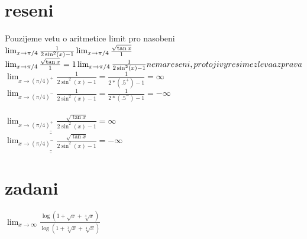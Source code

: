 \documentclass[a4paper]{article}
\def\doubleunderline#1{\underline{\underline{#1}}}
\begin{document}
\section*{reseni}
Pouzijeme vetu o aritmetice limit pro nasobeni\\
$
\lim_{x \rightarrow \pi / 4} \frac{1}{2 \sin^2 (x) -1}\\
\lim_{x \rightarrow \pi / 4} \frac{\sqrt{\tan x}}{1}
$\\
$
\lim_{x \rightarrow \pi / 4} \frac{\sqrt{\tan x}}{1} = 1
\lim_{x \rightarrow \pi / 4} \frac{1}{2 \sin^2 (x) -1} nema reseni, proto ji vyresime zleva a zprava\\
$
$\lim_{x \rightarrow (\pi / 4)^+} \frac{1}{2 \sin^2 (x) - 1} = \frac{1}{2*(.5^+)-1} = \infty$\\
$\lim_{x \rightarrow (\pi / 4)^-} \frac{1}{2 \sin^2 (x) - 1} = \frac{1}{2*(.5^-)-1} = -\infty$\\
\\
$\doubleunderline{\lim_{x \rightarrow (\pi / 4)^+} \frac{\sqrt{\tan x}}{2 \sin^2 (x) -1}} = \infty$\\
$\doubleunderline{\lim_{x \rightarrow (\pi / 4)^-} \frac{\sqrt{\tan x}}{2 \sin^2 (x) -1}} = -\infty$






\section*{zadani}
$\lim_{x \rightarrow \infty} \frac{\log(1+\sqrt{x}+\sqrt[3]{x})}{\log(1+\sqrt[3]{x}+\sqrt[4]{x})}$
\end{document}
